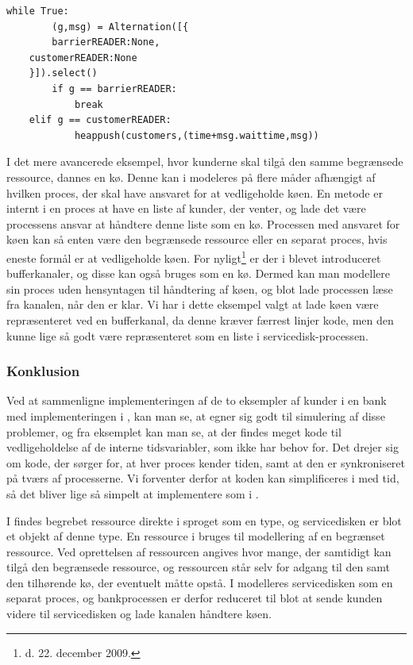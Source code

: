 \begin{lstlisting}[float=hbtp,label=bank-alternation-imp,caption=Modtage en 
  kunde eller et barrierekald i bankprocessen]
while True:
		(g,msg) = Alternation([{
		barrierREADER:None,
    customerREADER:None
    }]).select()
		if g == barrierREADER:
			break
    elif g == customerREADER:
			heappush(customers,(time+msg.waittime,msg))
\end{lstlisting}


I det mere avancerede eksempel, hvor kunderne skal tilgå den samme begrænsede 
ressource, dannes en kø. Denne kan i \pycsp modeleres på flere måder afhængigt 
af hvilken proces, der skal have ansvaret for at vedligeholde køen. En metode er 
internt i en proces at have en liste af kunder, der venter, og lade det være 
processens ansvar at håndtere denne liste som en kø. Processen med ansvaret for køen kan 
så enten være den begrænsede ressource eller en separat proces, hvis eneste 
formål er at vedligeholde køen. For nyligt\footnote{d. 22. december 2009.} er 
der i \pycsp blevet introduceret bufferkanaler\cite{pycsp-r147}, og 
disse kan også bruges som en kø. Dermed kan man modellere sin proces uden 
hensyntagen til håndtering af køen, og blot lade processen læse fra kanalen, når den er klar. Vi har i dette eksempel valgt 
at lade køen være repræsenteret ved en bufferkanal, da denne  kræver 
færrest linjer kode, men den kunne lige så godt være repræsenteret som en liste 
i servicedisk-processen.


\subsubsection{Konklusion}
Ved at sammenligne implementeringen af de to eksempler af kunder i en bank med implementeringen i \simpy, kan man se, at \des  egner sig godt til 
simulering af disse problemer, og fra eksemplet kan man se, at der findes meget kode til 
vedligeholdelse af de interne tidsvariabler, som \simpy ikke har behov for. Det drejer sig 
om kode, der sørger for, at hver proces kender tiden, samt at den er 
synkroniseret på tværs af processerne. Vi forventer derfor at koden kan 
simplificeres i \pycsp med tid, så det bliver lige så simpelt at implementere som i 
\simpy. 

I \simpy findes begrebet ressource direkte i sproget som en type, og servicedisken er blot et objekt af denne type. 
En ressource i \simpy bruges til modellering af en begrænset ressource. Ved oprettelsen af ressourcen angives hvor mange, der samtidigt kan tilgå den begrænsede ressource, og ressourcen står selv for adgang til den samt den tilhørende kø, der eventuelt måtte opstå. 
I \pycsp modelleres servicedisken som en separat proces, og 
bankprocessen er derfor reduceret til blot at sende kunden videre til 
servicedisken og lade kanalen håndtere køen. 

